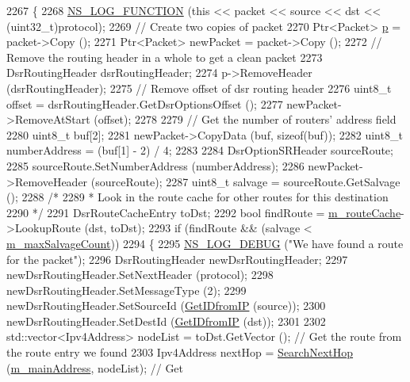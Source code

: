 \begin{DoxyCode}
2267 \{
2268   \hyperlink{log-macros-disabled_8h_a90b90d5bad1f39cb1b64923ea94c0761}{NS\_LOG\_FUNCTION} (\textcolor{keyword}{this} << packet << source << dst << (uint32\_t)protocol);
2269   \textcolor{comment}{// Create two copies of packet}
2270   Ptr<Packet> \hyperlink{lte__link__budget_8m_ac9de518908a968428863f829398a4e62}{p} = packet->Copy ();
2271   Ptr<Packet> newPacket = packet->Copy ();
2272   \textcolor{comment}{// Remove the routing header in a whole to get a clean packet}
2273   DsrRoutingHeader dsrRoutingHeader;
2274   p->RemoveHeader (dsrRoutingHeader);
2275   \textcolor{comment}{// Remove offset of dsr routing header}
2276   uint8\_t offset = dsrRoutingHeader.GetDsrOptionsOffset ();
2277   newPacket->RemoveAtStart (offset);
2278 
2279   \textcolor{comment}{// Get the number of routers' address field}
2280   uint8\_t buf[2];
2281   newPacket->CopyData (buf, \textcolor{keyword}{sizeof}(buf));
2282   uint8\_t numberAddress = (buf[1] - 2) / 4;
2283 
2284   DsrOptionSRHeader sourceRoute;
2285   sourceRoute.SetNumberAddress (numberAddress);
2286   newPacket->RemoveHeader (sourceRoute);
2287   uint8\_t salvage = sourceRoute.GetSalvage ();
2288   \textcolor{comment}{/*}
2289 \textcolor{comment}{   * Look in the route cache for other routes for this destination}
2290 \textcolor{comment}{   */}
2291   DsrRouteCacheEntry toDst;
2292   \textcolor{keywordtype}{bool} findRoute = \hyperlink{classns3_1_1dsr_1_1DsrRouting_ac409bdb961b9fff0fb63ebd026be99ad}{m\_routeCache}->LookupRoute (dst, toDst);
2293   \textcolor{keywordflow}{if} (findRoute && (salvage < \hyperlink{classns3_1_1dsr_1_1DsrRouting_a89f7e66d9f1bd83433b004876acf4a45}{m\_maxSalvageCount}))
2294     \{
2295       \hyperlink{group__logging_ga413f1886406d49f59a6a0a89b77b4d0a}{NS\_LOG\_DEBUG} (\textcolor{stringliteral}{"We have found a route for the packet"});
2296       DsrRoutingHeader newDsrRoutingHeader;
2297       newDsrRoutingHeader.SetNextHeader (protocol);
2298       newDsrRoutingHeader.SetMessageType (2);
2299       newDsrRoutingHeader.SetSourceId (\hyperlink{classns3_1_1dsr_1_1DsrRouting_a4593e50d5f36e9b9b013fe0422067c44}{GetIDfromIP} (source));
2300       newDsrRoutingHeader.SetDestId (\hyperlink{classns3_1_1dsr_1_1DsrRouting_a4593e50d5f36e9b9b013fe0422067c44}{GetIDfromIP} (dst));
2301 
2302       std::vector<Ipv4Address> nodeList = toDst.GetVector ();     \textcolor{comment}{// Get the route from the route entry we
       found}
2303       Ipv4Address nextHop = \hyperlink{classns3_1_1dsr_1_1DsrRouting_aa1b16658c14499af76ca7dd69c034f22}{SearchNextHop} (\hyperlink{classns3_1_1dsr_1_1DsrRouting_a73182b5edee2d8460f28855e058fc9a0}{m\_mainAddress}, nodeList);      \textcolor{comment}{// Get
}
\end{DoxyCode}

